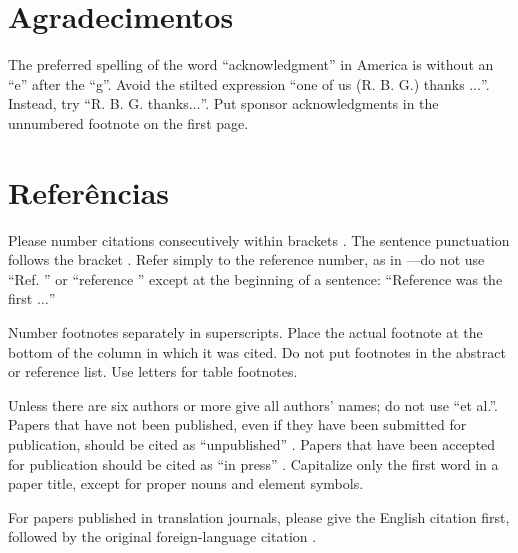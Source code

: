 \documentclass[conference]{IEEEtran}
\begin{document}
\section*{Agradecimentos}

The preferred spelling of the word ``acknowledgment'' in America is without an ``e'' after the ``g''. Avoid the stilted expression ``one of us (R. B. G.) thanks $\ldots$''. Instead, try ``R. B. G. thanks$\ldots$''. Put sponsor acknowledgments in the unnumbered footnote on the first page.

\section*{Referências}

Please number citations consecutively within brackets \cite{eason1955certain}.
The sentence punctuation follows the bracket \cite{clerk1892maxwell}. Refer simply to the reference number, as in \cite{jacobs1963fine}---do not use ``Ref. \cite{jacobs1963fine}'' or ``reference \cite{jacobs1963fine}'' except at
the beginning of a sentence: ``Reference \cite{jacobs1963fine} was the first $\ldots$''

Number footnotes separately in superscripts. Place the actual footnote at
the bottom of the column in which it was cited. Do not put footnotes in the
abstract or reference list. Use letters for table footnotes.

Unless there are six authors or more give all authors' names; do not use
``et al.''. Papers that have not been published, even if they have been
submitted for publication, should be cited as ``unpublished'' \cite{nicoletitle}. Papers
that have been accepted for publication should be cited as ``in press'' \cite{elissatitle}.
Capitalize only the first word in a paper title, except for proper nouns and
element symbols.

For papers published in translation journals, please give the English
citation first, followed by the original foreign-language citation \cite{yorozu1987electron}.
\end{document}

